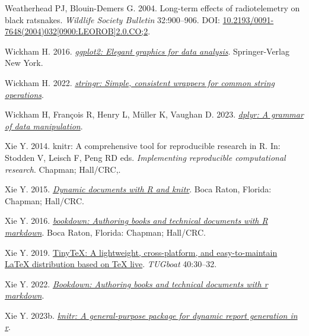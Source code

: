 \documentclass[10pt,a4paper]{article}
\newlength{\cslhangindent}
\newlength{\cslentryspacingunit} %
\newenvironment{CSLReferences}[2] %
 {%
  \setlength{\parindent}{0pt}
  \ifodd #1
  \let\oldpar\par
  \def\par{\hangindent=\cslhangindent\oldpar}
  \fi
  \setlength{\parskip}{#2\cslentryspacingunit}
 }%
 {}
\begin{document}
\begin{CSLReferences}{1}{0}
\leavevmode{}%
Weatherhead PJ, Blouin-Demers G. 2004. Long-term effects of radiotelemetry on black ratsnakes. \emph{Wildlife Society Bulletin} 32:900--906. DOI: \href{https://doi.org/10.2193/0091-7648(2004)032\%5B0900:LEOROB\%5D2.0.CO;2}{10.2193/0091-7648(2004)032{[}0900:LEOROB{]}2.0.CO;2}.

\leavevmode{}%
Wickham H. 2016. \emph{\href{https://ggplot2.tidyverse.org}{ggplot2: Elegant graphics for data analysis}}. Springer-Verlag New York.

\leavevmode{}%
Wickham H. 2022. \emph{\href{https://CRAN.R-project.org/package=stringr}{{stringr}: Simple, consistent wrappers for common string operations}}.

\leavevmode{}%
Wickham H, François R, Henry L, Müller K, Vaughan D. 2023. \emph{\href{https://CRAN.R-project.org/package=dplyr}{{dplyr}: A grammar of data manipulation}}.

\leavevmode{}%
Xie Y. 2014. {knitr}: A comprehensive tool for reproducible research in {R}. In: Stodden V, Leisch F, Peng RD eds. \emph{Implementing reproducible computational research}. Chapman; Hall/CRC,.

\leavevmode{}%
Xie Y. 2015. \emph{\href{https://yihui.org/knitr/}{Dynamic documents with {R} and knitr}}. Boca Raton, Florida: Chapman; Hall/CRC.

\leavevmode{}%
Xie Y. 2016. \emph{\href{https://bookdown.org/yihui/bookdown}{{bookdown}: Authoring books and technical documents with {R} markdown}}. Boca Raton, Florida: Chapman; Hall/CRC.

\leavevmode{}%
Xie Y. 2019. \href{https://tug.org/TUGboat/Contents/contents40-1.html}{{TinyTeX}: A lightweight, cross-platform, and easy-to-maintain LaTeX distribution based on TeX live}. \emph{TUGboat} 40:30--32.

\leavevmode{}%
Xie Y. 2022. \emph{\href{https://CRAN.R-project.org/package=bookdown}{Bookdown: Authoring books and technical documents with r markdown}}.

\leavevmode{}%
Xie Y. 2023b. \emph{\href{https://yihui.org/knitr/}{{knitr}: A general-purpose package for dynamic report generation in r}}.


\end{CSLReferences}
\end{document}
